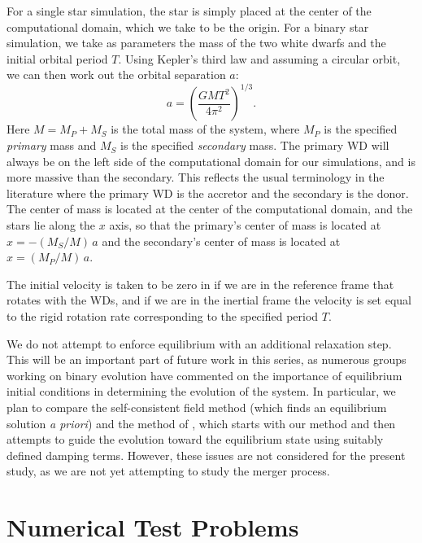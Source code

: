 \documentclass[12pt,preprint]{aastex}
\begin{document}
For a single star simulation, the star is simply placed at the center of the computational domain, which we take to be the origin. For a binary star simulation, we take as parameters the mass of the two white dwarfs and the initial orbital period $T$. Using Kepler's third law and assuming a circular orbit, we can then work out the orbital separation $a$:
\begin{equation}
  a = \left(\frac{GM T^2}{4\pi^2}\right)^{1/3}.
\end{equation}
Here $M = M_P + M_S$ is the total mass of the system, where $M_P$ is the specified \textit{primary} mass and $M_S$ is the specified \textit{secondary} mass. The primary WD will always be on the left side of the computational domain for our simulations, and is more massive than the secondary. This reflects the usual terminology in the literature where the primary WD is the accretor and the secondary is the donor. The center of mass is located at the center of the computational domain, and the stars lie along the $x$ axis, so that the primary's center of mass is located at $x = -(M_S / M)\, a$ and the secondary's center of mass is located at $x = (M_P / M)\, a$.

The initial velocity is taken to be zero in if we are in the reference frame that rotates with the WDs, and if we are in the inertial frame the velocity is set equal to the rigid rotation rate corresponding to the specified period $T$.

We do not attempt to enforce equilibrium with an additional relaxation step. This will be an important part of future work in this series, as numerous groups working on binary evolution \citep{swc:2000,motl:2002,rosswog:2004,dan:2011,pakmor:2012:gadget} have commented on the importance of equilibrium initial conditions in determining the evolution of the system. In particular, we plan to compare the self-consistent field method (which finds an equilibrium solution \textit{a priori}) and the method of \cite{rosswog:2004}, which starts with our method and then attempts to guide the evolution toward the equilibrium state using suitably defined damping terms. However, these issues are not considered for the present study, as we are not yet attempting to study the merger process.

\section{Numerical Test Problems}\label{sec:Tests}
\end{document}
